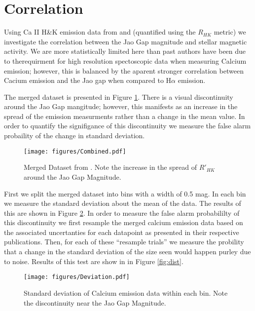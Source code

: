 \section{Correlation}\label{sec:results}
Using Ca II H\&K emission data from \citet{Boudreaux2022} and
\citet{Perdelwitz2021} (quantified using the $R_{HK}$ metric) we investigate
the correlation between the Jao Gap magnitude and stellar magnetic activity. We
are more statistically limited here than past authors have been due to
therequirment for high resolution spectoscopic data when measuring Calcium
emission; however, this is balanced by the aparent stronger correlation between
Cacium emission and the Jao gap when compared to H$\alpha$ emission. 

The merged dataset is presented in Figure \ref{fig:mergedData}. There is a
visual discontinuity around the Jao Gap mangitude; however, this manifests as
an increase in the spread of the emission measurments rather than a change in
the mean value. In order to quantify the signifigance of this discontinuity we
measure the false alarm probaility of the change in standard deviation.

\begin{figure}
  \centering
  \texttt{[image: figures/Combined.pdf]}
  \caption{Merged Dataset from \citet{Boudreaux2022, Perdelwitz2021}. Note the
  increase in the spread of $R'_{HK}$ around the Jao Gap Magnitude.}
  \label{fig:mergedData}
\end{figure}

First we split the merged dataset into bins with a width of 0.5 mag. In each bin we
measure the standard deviation about the mean of the data. The results of this
are shown in Figure \ref{fig:deviation}. In order to measure the false alarm
probabililty of this discontinuity we first resample the merged calcium
emission data based on the associated uncertanties for each datapoint as
presented in their respective publications. Then, for each of these ``resample
trials'' we measure the probility that a change in the standard deviation of
the size seen would happen purley due to noise. Results of this test are show in
in Figure \ref{fig:dist}. 

\begin{figure}
  \centering
  \texttt{[image: figures/Deviation.pdf]}
  \caption{Standard deviation of Calcium emission data within each bin. Note
  the discontinuity near the Jao Gap Magnitude.}
  \label{fig:deviation}
\end{figure}

